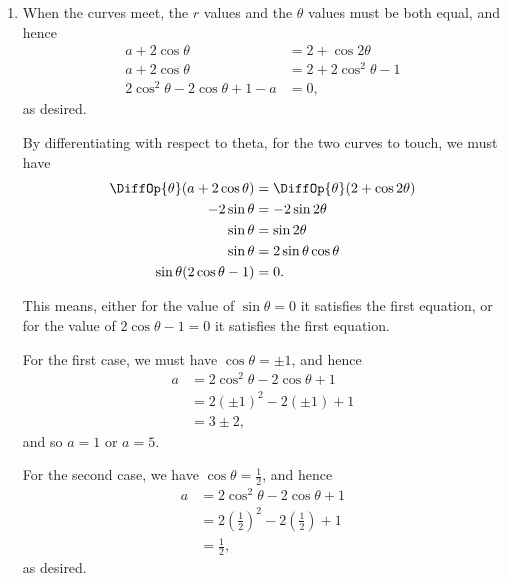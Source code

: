 \Question{\currfilebase}

\begin{enumerate}
    \item When the curves meet, the \(r\) values and the \(\theta\) values must be both equal, and hence
          \begin{align*}
              a + 2 \cos \theta                       & = 2 + \cos 2\theta        \\
              a + 2 \cos \theta                       & = 2 + 2 \cos^2 \theta - 1 \\
              2 \cos^2 \theta - 2 \cos \theta + 1 - a & = 0,
          \end{align*}
          as desired.

          By differentiating with respect to theta, for the two curves to touch, we must have
          \begin{align*}
              \DiffOp{\theta} (a + 2 \cos \theta) & = \DiffOp{\theta} (2 + \cos 2 \theta) \\
              - 2 \sin \theta                     & = - 2 \sin 2 \theta                   \\
              \sin \theta                         & = \sin 2 \theta                       \\
              \sin \theta                         & = 2 \sin \theta \cos \theta           \\
              \sin \theta (2 \cos \theta - 1)     & = 0.
          \end{align*}

          This means, either for the value of \(\sin \theta = 0\) it satisfies the first equation, or for the value of \(2 \cos \theta - 1 = 0\) it satisfies the first equation.

          For the first case, we must have \(\cos \theta = \pm 1\), and hence
          \begin{align*}
              a & = 2 \cos^2 \theta - 2 \cos \theta + 1 \\
                & = 2 (\pm 1)^2 - 2 (\pm 1) + 1         \\
                & = 3 \pm 2,
          \end{align*}
          and so \(a = 1\) or \(a = 5\).

          For the second case, we have \(\cos \theta = \frac{1}{2}\), and hence
          \begin{align*}
              a & = 2 \cos^2 \theta - 2 \cos \theta + 1                            \\
                & = 2 \left(\frac{1}{2}\right)^2  - 2 \left(\frac{1}{2}\right) + 1 \\
                & = \frac{1}{2},
          \end{align*}
          as desired.


\end{enumerate}
